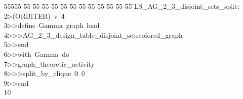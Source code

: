 %
%
\begin{tabbing}
55555 \= 55 \= 55 \= 55 \= 55 \= 55 \= 55 \= 55 \= 55 \= 55 \= 55 \= 55 \= 55 \= \>LS\_AG\_2\_3\_disjoint\_sets\_split:\\[0pt]
2\>$\triangleright$\>(ORBITER)\ v\ 4\ \\[0pt]
3\>$\triangleright$\>$\triangleright$\>define\ Gamma\ graph\ load\ \\[0pt]
4\>$\triangleright$\>$\triangleright$\>$\triangleright$\>AG\_2\_3\_design\_table\_disjoint\_setscolored\_graph\ \\[0pt]
5\>$\triangleright$\>$\triangleright$\>end\ \\[0pt]
6\>$\triangleright$\>$\triangleright$\>with\ Gamma\ do\ \\[0pt]
7\>$\triangleright$\>$\triangleright$\>graph\_theoretic\_activity\ \\[0pt]
8\>$\triangleright$\>$\triangleright$\>$\triangleright$\>split\_by\_clique\ 0\ 0\ \\[0pt]
9\>$\triangleright$\>$\triangleright$\>end\\[0pt]
10\>\end{tabbing}
